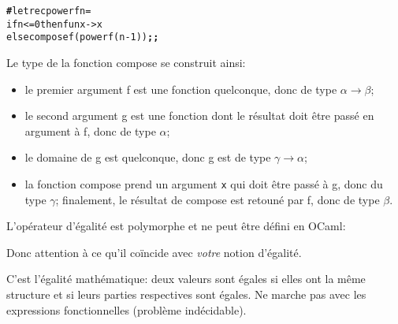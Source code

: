 \begin{alltt}
\textbf{\#} let rec power f n =
    if n <= 0 then fun x -> x
              else compose f (power f (n-1))\textbf{;;}
\end{alltt}

\noindent{}

\noindent{}

\bigskip

\noindent Le type de la fonction \textsf{compose} se construit ainsi:
\begin{itemize}

  \item le premier argument \textsf{f} est une fonction quelconque,
  donc de type $\alpha \rightarrow \beta$; 

  \item le second argument \textsf{g} est une fonction dont le
  résultat doit être passé en argument à \textsf{f}, donc de type
  $\alpha$; 

  \item le domaine de \textsf{g} est quelconque, donc \textsf{g} est
  de type $\gamma \rightarrow \alpha$; 

  \item la fonction \textsf{compose} prend un argument \texttt{x} qui
  doit être passé à \textsf{g}, donc du type $\gamma$; finalement, le
  résultat de \textsf{compose} est retouné par \textsf{f}, donc de
  type $\beta$.

\end{itemize}

\noindent L'opérateur d'égalité est polymorphe et ne peut être défini
en OCaml:

\bigskip

\noindent\topin{( = )}

\noindent{}

\bigskip

Donc attention à ce qu'il coïncide avec \emph{votre} notion d'égalité.

C'est l'égalité mathématique: deux valeurs sont égales si elles ont la
même structure et si leurs parties respectives sont égales. Ne marche
pas avec les expressions fonctionnelles (problème indécidable).

